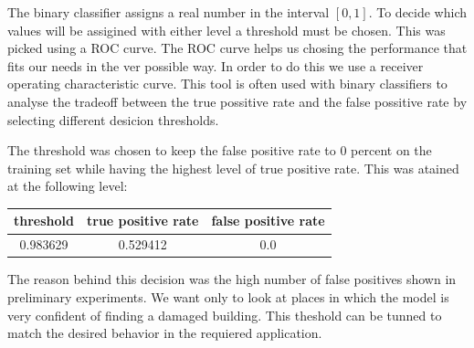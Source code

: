 The binary classifier assigns a real number in the interval $[0,1]$. To decide which values will be assigined with either level a threshold must be chosen. This was picked using a ROC curve. The ROC curve helps us chosing the performance that fits our needs in the ver possible way. In order to do this we use a receiver operating characteristic curve. This tool is often used with binary classifiers to analyse the tradeoff between the true possitive rate and the false possitive rate by selecting different desicion thresholds.

\begin{figure}[h]
  \begin{center}
  \end{center}
\end{figure}

The threshold was chosen to keep the false positive rate to 0 percent on the training set while having the highest level of true positive rate. This was atained at the following level:

\begin{center}
  \begin{tabular}{|c|c|c|}
    \hline
    threshold & true positive rate & false positive rate \\ \hline
    0.983629 & 0.529412 & 0.0 \\
    \hline
  \end{tabular}
\end{center}

The reason behind this decision was the high number of false positives shown in preliminary experiments. We want only to look at places in which the model is very confident of finding a damaged building. This theshold can be tunned to match the desired behavior in the requiered application.

